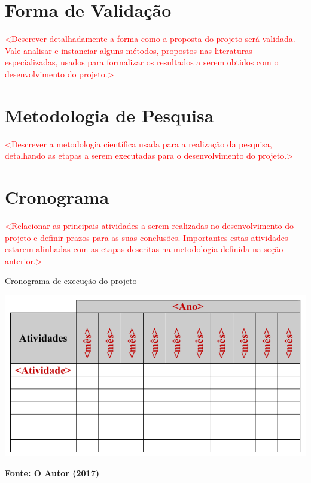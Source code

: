 \documentclass[
	12pt,				%
	openright,			%
	oneside,			%
	a4paper,			%
	chapter=TITLE,		%
	english,			%
	french,				%
	spanish,			%
	brazil				%
	]{abntex2}
\begin{document}
\chapter{Forma de Validação}
\label{cap:validacao}

\textcolor{red}{<Descrever detalhadamente a forma como a proposta do projeto será validada. Vale analisar e instanciar alguns métodos, propostos nas literaturas especializadas, usados para formalizar os resultados a serem obtidos com o desenvolvimento do projeto.>}

\chapter{Metodologia de Pesquisa}
\label{cap:metodologia}

\textcolor{red}{<Descrever a metodologia científica usada para a realização da pesquisa, detalhando as etapas a serem executadas para o desenvolvimento do projeto.>}

\chapter{Cronograma}
\label{cap:cronograma}

\textcolor{red}{<Relacionar as principais atividades a serem realizadas no desenvolvimento do projeto e definir prazos para as suas conclusões. Importantes estas atividades estarem alinhadas com as etapas descritas na metodologia definida na seção anterior.>}

\begin{table}[!htb]
	\caption{Cronograma de execução do projeto}
	\label{tab:cronograma}
	\centering
	\includegraphics[width=1\textwidth]{cronograma.pdf} \\
	\begin{small}\textbf{Fonte: O Autor (2017)}\end{small}
\end{table}


\postextual


\end{document}
